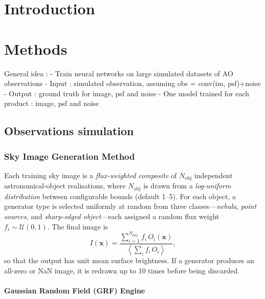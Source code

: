 \documentclass{aa}
\begin{document}
\section{Introduction}

\cite{2025A&A...704A.295V}

\section{Methods}

General idea : 
- Train neural networks on large simulated datasets of AO observations
- Input : simulated observation, assuming obs = conv(im, psf)+noise
- Output : ground truth for image, psf and noise
- One model trained for each product : image, psf and noise

\subsection{Observations simulation}



\subsubsection{Sky Image Generation Method}


Each training sky image is a \emph{flux-weighted composite} of $N_\mathrm{obj}$ independent astronomical-object realisations, where $N_\mathrm{obj}$ is drawn from a \emph{log-uniform distribution} between configurable bounds (default 1--5). For each object, a generator type is selected uniformly at random from three classes---\emph{nebula}, \emph{point sources}, and \emph{sharp-edged object}---each assigned a random flux weight $f_i \sim \mathcal{U}(0,1)$. The final image is
\begin{equation}
I(\mathbf{x}) = \frac{\sum_{i=1}^{N_\mathrm{obj}} f_i \, O_i(\mathbf{x})}{\left\langle \sum_i f_i \, O_i \right\rangle},
\end{equation}
so that the output has unit mean surface brightness. If a generator produces an all-zero or NaN image, it is redrawn up to 10 times before being discarded.

\paragraph{Gaussian Random Field (GRF) Engine}
\end{document}
